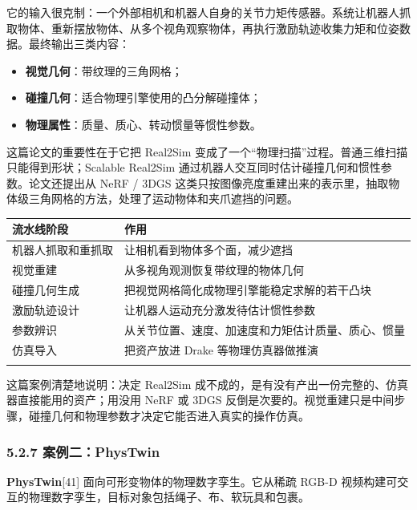 \documentclass[
  chinese,
]{ctexart}
\providecommand{\tightlist}{%
  \setlength{\itemsep}{0pt}\setlength{\parskip}{0pt}}
\begin{document}
它的输入很克制：一个外部相机和机器人自身的关节力矩传感器。系统让机器人抓取物体、重新摆放物体、从多个视角观察物体，再执行激励轨迹收集力矩和位姿数据。最终输出三类内容：

\begin{itemize}
\tightlist
\item
  \textbf{视觉几何}：带纹理的三角网格；
\item
  \textbf{碰撞几何}：适合物理引擎使用的凸分解碰撞体；
\item
  \textbf{物理属性}：质量、质心、转动惯量等惯性参数。
\end{itemize}

这篇论文的重要性在于它把 Real2Sim
变成了一个``物理扫描''过程。普通三维扫描只能得到形状；Scalable Real2Sim
通过机器人交互同时估计碰撞几何和惯性参数。论文还提出从 NeRF / 3DGS
这类只按图像亮度重建出来的表示里，抽取物体级三角网格的方法，处理了运动物体和夹爪遮挡的问题。

\begin{center}
\begin{tabular}{@{}>{\raggedright\arraybackslash}p{} >{\raggedright\arraybackslash}p{}@{}}
\toprule\noalign{}
流水线阶段 & 作用 \\
\midrule\noalign{}
机器人抓取和重抓取 & 让相机看到物体多个面，减少遮挡 \\
视觉重建 & 从多视角观测恢复带纹理的物体几何 \\
碰撞几何生成 & 把视觉网格简化成物理引擎能稳定求解的若干凸块 \\
激励轨迹设计 & 让机器人运动充分激发待估计惯性参数 \\
参数辨识 & 从关节位置、速度、加速度和力矩估计质量、质心、惯量 \\
仿真导入 & 把资产放进 Drake 等物理仿真器做推演 \\
\bottomrule\noalign{}
\end{tabular}
\end{center}

这篇案例清楚地说明：决定 Real2Sim
成不成的，是有没有产出一份完整的、仿真器直接能用的资产；用没用 NeRF 或
3DGS
反倒是次要的。视觉重建只是中间步骤，碰撞几何和物理参数才决定它能否进入真实的操作仿真。

\subsubsection{5.2.7 案例二：PhysTwin}\label{ux6848ux4f8bux4e8cphystwin}

\textbf{PhysTwin}{[}41{]} 面向可形变物体的物理数字孪生。它从稀疏 RGB-D
视频构建可交互的物理数字孪生，目标对象包括绳子、布、软玩具和包裹。
\end{document}
